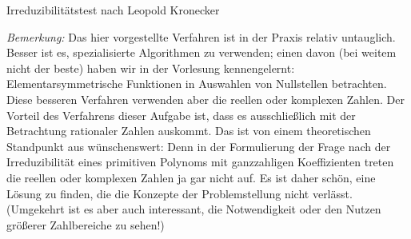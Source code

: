 \documentclass{algblatt}
\begin{document}
\begin{aufgabe}{Irreduzibilitätstest nach Leopold Kronecker}
\begin{loesungE}
\emph{Bemerkung:} Das hier vorgestellte Verfahren ist in der Praxis relativ
untauglich. Besser ist es, spezialisierte Algorithmen zu verwenden; einen davon
(bei weitem nicht der beste) haben wir in der Vorlesung kennengelernt:
Elementarsymmetrische Funktionen in Auswahlen von Nullstellen betrachten.
Diese besseren Verfahren verwenden
aber die reellen oder komplexen Zahlen. Der Vorteil des Verfahrens dieser
Aufgabe ist, dass es ausschließlich mit der Betrachtung rationaler Zahlen
auskommt. Das ist von einem theoretischen Standpunkt aus wünschenswert: Denn in
der Formulierung der Frage nach der Irreduzibilität eines primitiven Polynoms
mit ganzzahligen Koeffizienten treten die reellen oder komplexen Zahlen ja gar
nicht auf. Es ist daher schön, eine Lösung zu finden, die die Konzepte der
Problemstellung nicht verlässt. (Umgekehrt ist es aber auch interessant, die
Notwendigkeit oder den Nutzen größerer Zahlbereiche zu sehen!)
\end{loesungE}
\end{aufgabe}
\end{document}

